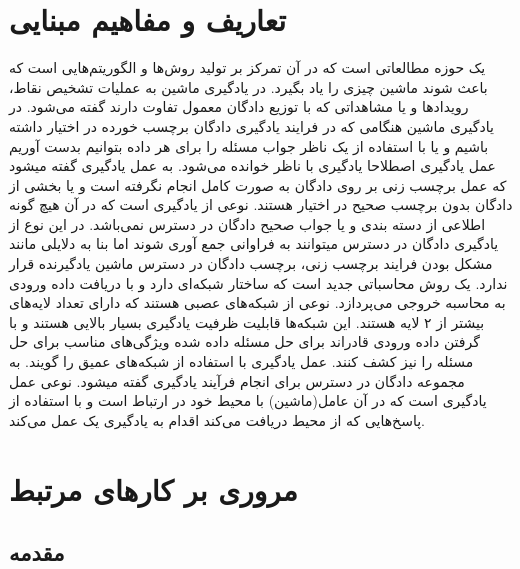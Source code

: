 \documentclass[12pt,a4paper]{article}
\theoremstyle{definition}
\theoremstyle{theorem}
\theoremstyle{definition}
\begin{document}
	\section{تعاریف و مفاهیم مبنایی}
		یک حوزه مطالعاتی است که در آن تمرکز بر تولید روش‌ها و الگوریتم‌هایی است که باعث شوند ماشین چیزی را یاد بگیرد.
		در یادگیری ماشین به عملیات تشخیص نقاط، رویدادها و یا مشاهداتی که با توزیع دادگان معمول تفاوت دارند گفته می‌شود.
در یادگیری ماشین هنگامی که در فرایند یادگیری دادگان برچسب خورده در اختیار داشته باشیم و یا با استفاده از یک ناظر جواب مسئله را برای هر داده بتوانیم بدست آوریم عمل یادگیری اصطلاحا یادگیری با ناظر خوانده می‌شود.
به عمل یادگیری گفته میشود که عمل برچسب زنی بر روی دادگان به صورت کامل انجام نگرفته است و یا بخشی از دادگان بدون برچسب صحیح در اختیار هستند.
نوعی از یادگیری است که در آن هیچ گونه اطلاعی از دسته بندی و یا جواب صحیح دادگان در دسترس نمی‌باشد. در این نوع از یادگیری دادگان در دسترس میتوانند به فراوانی جمع آوری شوند اما بنا به دلایلی مانند مشکل بودن فرایند برچسب زنی، برچسب دادگان در دسترس ماشین یادگیرنده قرار ندارد.
یک روش محاسباتی جدید است که ساختار شبکه‌ای دارد و با دریافت داده ورودی به محاسبه خروجی می‌پردازد.
نوعی از شبکه‌های عصبی هستند که دارای تعداد لایه‌های بیشتر از ۲ لایه هستند. این شبکه‌ها قابلیت ظرفیت یادگیری بسیار بالایی هستند و با گرفتن داده ورودی قادراند برای حل مسئله داده شده ویژگی‌های مناسب برای حل مسئله را نیز کشف کنند.
عمل یادگیری با استفاده از شبکه‌های عمیق را گویند.
به مجموعه دادگان در دسترس برای انجام فرآیند یادگیری گفته میشود.
نوعی عمل یادگیری است که در آن عامل(ماشین) با محیط خود در ارتباط است و با استفاده از پاسخ‌هایی که از محیط دریافت می‌کند اقدام به یادگیری یک عمل می‌کند.
		
	\section{مروری بر کار‌های مرتبط}
	\subsection{مقدمه}
\end{document}
